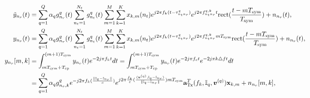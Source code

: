 \documentclass[9pt,final,journal,twocolumn]{IEEEtran}
\begin{document}
\begin{figure}[!t]
{
\begin{align}
   \tilde{y}_{n_r}(t) &=  \sum_{q=1}^{Q}{\alpha}_q g_{n_r}^q(t)
    \sum_{n_t=1}^{N_t}g_{n_t}^q(t) 
  \sum_{m=1}^{M}\sum_{k=1}^{K} {x}_{k,m}(n_t)e^{j2\pi{f_k}(t-\tau_{n_tn_r}^{q})}e^{j2\pi{f_{n_tn_r}^{q,k}}t}\mathrm{rect}(\frac{t-mT_{\mathrm{sym}}}{T_{\mathrm{sym}}})+n_{n_r}(t), \label{Radar_Rx_R1}\\
  y_{n_r}(t)  &=  \sum_{q=1}^{Q}{\alpha}_q g_{n_r}^q(t)
    \sum_{n_t=1}^{N_t}g_{n_t}^q(t) 
  \sum_{m=1}^{M}\sum_{k=1}^{K} {x}_{k,m}(n_t)e^{j2\pi{f_k}(t-\tau_{n_tn_r}^{q})}e^{j2\pi{f_{n_tn_r}^{q,k}}mT_{\mathrm{sym}}}\mathrm{rect}(\frac{t-mT_{\mathrm{sym}}}{T_{\mathrm{sym}}})+n_{n_r}(t), \label{Radar_Rx_R2} \\
     y_{n_r}[m,k] 
   & = \int_{mT_{\mathrm{sym}}+T_{\mathrm{cp}}}^{(m+1)T_{\mathrm{sym}}}y_{n_r}(t)e^{-2j\pi f_kt}dt =\int_{mT_{\mathrm{sym}}+T_{\mathrm{cp}}}^{(m+1)T_{\mathrm{sym}}}y_{n_r}(t)e^{-2j\pi f_ct}e^{-2j\pi k\triangle ft}dt \nonumber\\
 &= \sum_{q=1}^{Q}{\alpha}_q g_{n_r,k}^q e^{-j2\pi{f_k}(\frac{\|{\mathbb I}_{q}-{\mathbb I}_{n_r}\|}{c})}e^{j2\pi\frac{f_k}{c}(\frac{\langle{\bm v}^{(q)}, {\mathbb I}_{q}-{\mathbb I}_{n_r}\rangle}{\|{\mathbb I}_{q}-{\mathbb I}_{n_r}\|})mT_{\mathrm{sym}}} {\bf a}_{\mathrm{Tx}}^T(f_k,{\mathbb I}_{q},{\bm v}^{(q)}){\bf x}_{k,m}+n_{n_r}[m,k], \label{Radar_Rx_R3}
\end{align}}
\hrulefill
\end{figure}
\end{document}
